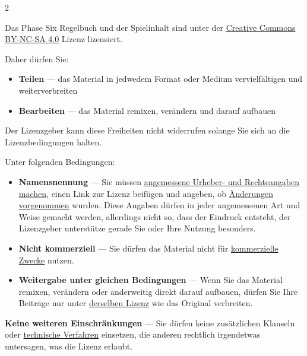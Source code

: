 \label{ch:license}

\begin{multicols}{2}

Das Phase Six Regelbuch und der Spielinhalt sind unter der \href{https://creativecommons.org/licenses/by-nc-sa/4.0/}{Creative Commons BY-NC-SA 4.0} Lizenz lizensiert.

Daher dürfen Sie:
\begin{itemize}
    \item \textbf{Teilen} — das Material in jedwedem Format oder Medium vervielfältigen und weiterverbreiten
    \item \textbf{Bearbeiten} — das Material remixen, verändern und darauf aufbauen
\end{itemize}

Der Lizenzgeber kann diese Freiheiten nicht widerrufen solange Sie sich an die Lizenzbedingungen halten.

Unter folgenden Bedingungen:
\begin{itemize}
    \item \textbf{Namensnennung} — Sie müssen \href{https://creativecommons.org/licenses/by-nc-sa/4.0/deed.de\#ref-appropriate-credit}{angemessene Urheber- und Rechteangaben machen}, einen Link zur Lizenz beifügen und angeben, ob \href{https://creativecommons.org/licenses/by-nc-sa/4.0/deed.de\#ref-indicate-changes}{Änderungen vorgenommen} wurden. Diese Angaben dürfen in jeder angemessenen Art und Weise gemacht werden, allerdings nicht so, dass der Eindruck entsteht, der Lizenzgeber unterstütze gerade Sie oder Ihre Nutzung besonders.
    \item \textbf{Nicht kommerziell} — Sie dürfen das Material nicht für \href{https://creativecommons.org/licenses/by-nc-sa/4.0/deed.de\#ref-commercial-purposes}{kommerzielle Zwecke} nutzen.
    \item \textbf{Weitergabe unter gleichen Bedingungen} — Wenn Sie das Material remixen, verändern oder anderweitig direkt darauf aufbauen, dürfen Sie Ihre Beiträge nur unter \href{https://creativecommons.org/licenses/by-nc-sa/4.0/deed.de\#ref-same-license}{derselben Lizenz} wie das Original verbreiten.
\end{itemize}

\textbf{Keine weiteren Einschränkungen} — Sie dürfen keine zusätzlichen Klauseln oder \href{https://creativecommons.org/licenses/by-nc-sa/4.0/deed.de\#ref-technological-measures}{technische Verfahren} einsetzen, die anderen rechtlich irgendetwas untersagen, was die Lizenz erlaubt.


\end{multicols}
